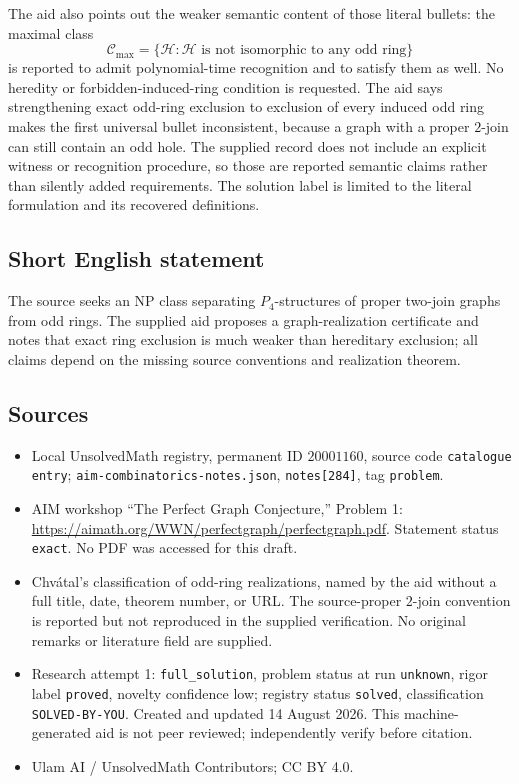 \documentclass[11pt]{article}
\begin{document}
The aid also points out the weaker semantic content of those literal bullets: the maximal class
\[
 \mathcal C_{\max}=\{\mathcal H:\mathcal H\text{ is not isomorphic to any odd ring}\}
\]
is reported to admit polynomial-time recognition and to satisfy them as well. No heredity or forbidden-induced-ring condition is requested. The aid says strengthening exact odd-ring exclusion to exclusion of every induced odd ring makes the first universal bullet inconsistent, because a graph with a proper \(2\)-join can still contain an odd hole. The supplied record does not include an explicit witness or recognition procedure, so those are reported semantic claims rather than silently added requirements. The solution label is limited to the literal formulation and its recovered definitions.
\subsection{Short English statement}
The source seeks an NP class separating \(P_4\)-structures of proper two-join graphs from odd rings. The supplied aid proposes a graph-realization certificate and notes that exact ring exclusion is much weaker than hereditary exclusion; all claims depend on the missing source conventions and realization theorem.
\subsection{Sources}
\begin{itemize}
\item Local UnsolvedMath registry, permanent ID \(20001160\), source code \texttt{catalogue entry}; \texttt{aim-combinatorics-notes.json}, \texttt{notes[284]}, tag \texttt{problem}.
\item AIM workshop ``The Perfect Graph Conjecture,'' Problem 1: \url{https://aimath.org/WWN/perfectgraph/perfectgraph.pdf}. Statement status \texttt{exact}. No PDF was accessed for this draft.
\item Chv\'atal's classification of odd-ring realizations, named by the aid without a full title, date, theorem number, or URL. The source-proper \(2\)-join convention is reported but not reproduced in the supplied verification. No original remarks or literature field are supplied.
\item Research attempt 1: \texttt{full\_solution}, problem status at run \texttt{unknown}, rigor label \texttt{proved}, novelty confidence low; registry status \texttt{solved}, classification \texttt{SOLVED-BY-YOU}. Created and updated 14 August 2026. This machine-generated aid is not peer reviewed; independently verify before citation.
\item Ulam AI / UnsolvedMath Contributors; CC BY 4.0.
\end{itemize}
\end{document}
